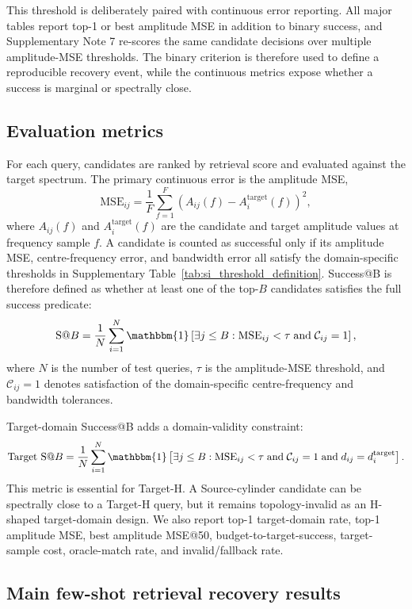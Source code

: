 \documentclass[final,1p,times]{elsarticle}
\begin{document}
This threshold is deliberately paired with continuous error reporting. All major tables report top-1 or best amplitude MSE in addition to binary success, and Supplementary Note 7 re-scores the same candidate decisions over multiple amplitude-MSE thresholds. The binary criterion is therefore used to define a reproducible recovery event, while the continuous metrics expose whether a success is marginal or spectrally close.

\subsection{Evaluation metrics}

For each query, candidates are ranked by retrieval score and evaluated against the target spectrum. The primary continuous error is the amplitude MSE,
\[
\mathrm{MSE}_{ij}=\frac{1}{F}\sum_{f=1}^{F}
\left(A_{ij}(f)-A_i^{\mathrm{target}}(f)\right)^2,
\]
where $A_{ij}(f)$ and $A_i^{\mathrm{target}}(f)$ are the candidate and target amplitude values at frequency sample $f$. A candidate is counted as successful only if its amplitude MSE, centre-frequency error, and bandwidth error all satisfy the domain-specific thresholds in Supplementary Table~\ref{tab:si_threshold_definition}. Success@B is therefore defined as whether at least one of the top-$B$ candidates satisfies the full success predicate:
\[
\mathrm{S@}B =
\frac{1}{N}\sum_{i=1}^{N}
\mathbbm{1}
\left[
\exists j\le B:
\mathrm{MSE}_{ij}<\tau
\;\mathrm{and}\;
\mathcal{C}_{ij}=1
\right],
\]
where $N$ is the number of test queries, $\tau$ is the amplitude-MSE threshold, and $\mathcal{C}_{ij}=1$ denotes satisfaction of the domain-specific centre-frequency and bandwidth tolerances.

Target-domain Success@B adds a domain-validity constraint:
\[
\mathrm{Target~S@}B =
\frac{1}{N}\sum_{i=1}^{N}
\mathbbm{1}
\left[
\exists j\le B:
\mathrm{MSE}_{ij}<\tau
\;\mathrm{and}\;
\mathcal{C}_{ij}=1
\;\mathrm{and}\;
d_{ij}=d_i^{\mathrm{target}}
\right].
\]
This metric is essential for Target-H. A Source-cylinder candidate can be spectrally close to a Target-H query, but it remains topology-invalid as an H-shaped target-domain design. We also report top-1 target-domain rate, top-1 amplitude MSE, best amplitude MSE@50, budget-to-target-success, target-sample cost, oracle-match rate, and invalid/fallback rate.

\subsection{Main few-shot retrieval recovery results}
\end{document}
